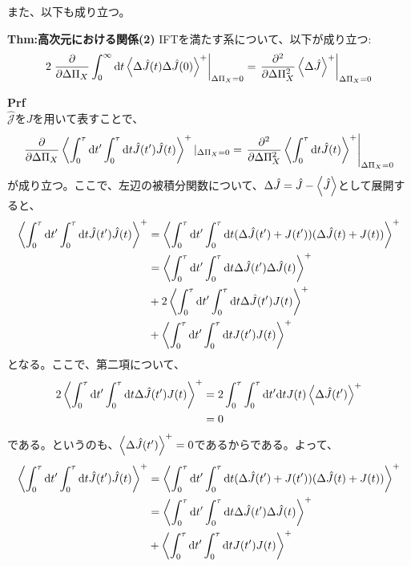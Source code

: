 \documentclass[a4paper,11pt]{jsarticle}
\begin{document}
また、以下も成り立つ。\\
\begin{itembox}[l]{\textbf{Thm:高次元における関係(2)}}
    IFTを満たす系について、以下が成り立つ:
    \begin{align}
        2\left.\pdv{\Delta \Pi_X} \int_0 ^{\infty} \dd t \ev{\Delta \hat{J}(t) \Delta \hat{J}(0)}^+\right|_{\Delta \Pi_X = 0} = \left.\pdv[2]{\Delta \Pi_X} \ev{\Delta \hat{J}}^+\right|_{\Delta \Pi_X = 0}
    \end{align}
\end{itembox}
\textbf{Prf}\\
$\hat{\mathcal{J}}$を$J$を用いて表すことで、
\begin{align}
    \pdv{\Delta \Pi_X} \ev{\int_0 ^{\tau} \dd t' \int_0 ^{\tau} \dd t \hat{J}(t')\hat{J}(t)}^+|_{\Delta \Pi_X = 0} = \left.\pdv[2]{\Delta \Pi_X} \ev{\int_0 ^{\tau} \dd t \hat{J}(t)}^+\right|_{\Delta \Pi_X = 0}
\end{align}
が成り立つ。ここで、左辺の被積分関数について、$\Delta \hat{J} = \hat{J} - \ev{\hat{J}}$として展開すると、
\begin{align}
    \ev{\int_0 ^{\tau} \dd t' \int_0 ^{\tau} \dd t \hat{J}(t')\hat{J}(t)}^+ &= \ev{\int_0 ^{\tau} \dd t' \int_0 ^{\tau} \dd t (\Delta \hat{J}(t') +{J}(t'))(\Delta \hat{J}(t) +{J}(t))}^+\\
    &= \ev{\int_0 ^{\tau} \dd t' \int_0 ^{\tau} \dd t \Delta \hat{J}(t')\Delta \hat{J}(t)}^+ \\
    &+ 2\ev{\int_0 ^{\tau} \dd t' \int_0 ^{\tau} \dd t \Delta \hat{J}(t'){J}(t)}^+\\
    &+ \ev{\int_0 ^{\tau} \dd t' \int_0 ^{\tau} \dd t {J}(t') {J}(t)}^+
\end{align}
となる。ここで、第二項について、
\begin{align}
    2\ev{\int_0 ^{\tau} \dd t' \int_0 ^{\tau} \dd t \Delta \hat{J}(t') {J}(t)}^+ &= 2\int_0 ^{\tau} \int_0 ^{\tau} \dd t' \dd t J(t) \ev{\Delta \hat{J}(t')}^+\\
    &= 0
\end{align}
である。というのも、$\ev{\Delta \hat{J}(t')}^+ = 0$であるからである。よって、
\begin{align}
    \ev{\int_0 ^{\tau} \dd t' \int_0 ^{\tau} \dd t \hat{J}(t')\hat{J}(t)}^+ &= \ev{\int_0 ^{\tau} \dd t' \int_0 ^{\tau} \dd t (\Delta \hat{J}(t') +{J}(t'))(\Delta \hat{J}(t) +{J}(t))}^+\\
    &= \ev{\int_0 ^{\tau} \dd t' \int_0 ^{\tau} \dd t \Delta \hat{J}(t')\Delta \hat{J}(t)}^+ \\
    &+ \ev{\int_0 ^{\tau} \dd t' \int_0 ^{\tau} \dd t {J}(t'){J}(t)}^+\\
\end{align}
\end{document}
